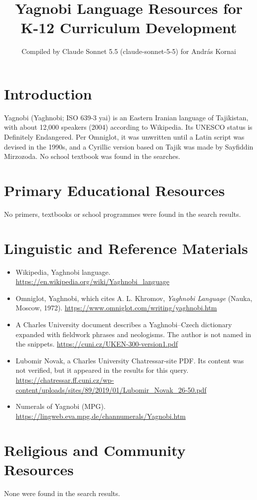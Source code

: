 \documentclass[12pt]{article}
\title{Yagnobi Language Resources for K-12 Curriculum Development}
\author{Compiled by Claude Sonnet 5.5 (claude-sonnet-5-5) for Andr\'as Kornai}
\date{}
\begin{document}
\maketitle

\section{Introduction}
Yagnobi (Yaghnobi; ISO 639-3 yai) is an Eastern Iranian language of Tajikistan, with about 12,000 speakers (2004) according to Wikipedia. Its UNESCO status is Definitely Endangered. Per Omniglot, it was unwritten until a Latin script was devised in the 1990s, and a Cyrillic version based on Tajik was made by Sayfiddin Mirzozoda. No school textbook was found in the searches.

\section{Primary Educational Resources}
No primers, textbooks or school programmes were found in the search results.

\section{Linguistic and Reference Materials}
\begin{itemize}
\item Wikipedia, Yaghnobi language. \url{https://en.wikipedia.org/wiki/Yaghnobi_language}
\item Omniglot, Yaghnobi, which cites A. L. Khromov, \emph{Yaghnobi Language} (Nauka, Moscow, 1972). \url{https://www.omniglot.com/writing/yaghnobi.htm}
\item A Charles University document describes a Yaghnobi--Czech dictionary expanded with fieldwork phrases and neologisms. The author is not named in the snippets. \url{https://cuni.cz/UKEN-300-version1.pdf}
\item Lubomir Novak, a Charles University Chatressar-site PDF. Its content was not verified, but it appeared in the results for this query. \url{https://chatressar.ff.cuni.cz/wp-content/uploads/sites/89/2019/01/Lubomir_Novak_26-50.pdf}
\item Numerals of Yagnobi (MPG). \url{https://lingweb.eva.mpg.de/channumerals/Yagnobi.htm}
\end{itemize}

\section{Religious and Community Resources}
None were found in the search results.
\end{document}
